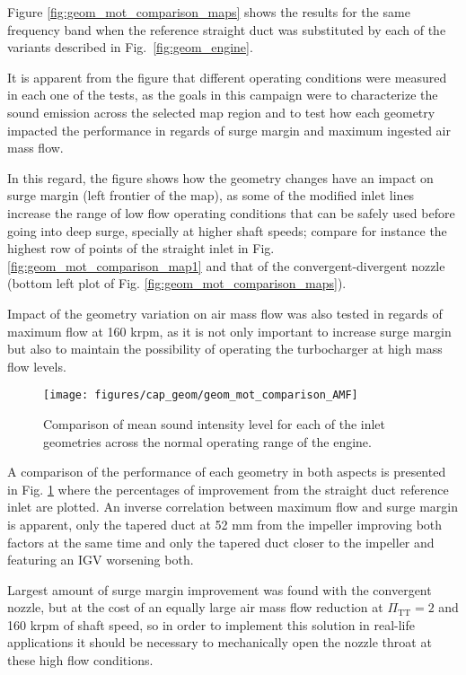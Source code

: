 Figure \ref{fig:geom_mot_comparison_maps} shows the results for the same frequency band when the reference straight duct was substituted by each of the variants described in Fig.~\ref{fig:geom_engine}. 

It is apparent from the figure that different operating conditions were measured in each one of the tests, as the goals in this campaign were to characterize the sound emission across the selected map region and to test how each geometry impacted the performance in regards of surge margin and maximum ingested air mass flow.

In this regard, the figure shows how the geometry changes have an impact on surge margin (left frontier of the map), as some of the modified inlet lines increase the range of low flow operating conditions that can be safely used before going into deep surge, specially at higher shaft speeds; compare for instance the highest row of points of the straight inlet in Fig. \ref{fig:geom_mot_comparison_map1} and that of the convergent-divergent nozzle (bottom left plot of Fig. \ref{fig:geom_mot_comparison_maps}).

Impact of the geometry variation on air mass flow was also tested in regards of maximum flow at 160 krpm, as it is not only important to increase surge margin but also to maintain the possibility of operating the turbocharger at high mass flow levels. 

\begin{figure}[t!]
\centering
\texttt{[image: figures/cap\_geom/geom\_mot\_comparison\_AMF]}
\caption{Comparison of mean sound intensity level for each of the inlet geometries across the normal operating range of the engine.}
\label{fig:geom_mot_comparison_AMF}
\end{figure}

A comparison of the performance of each geometry in both aspects is presented in Fig. \ref{fig:geom_mot_comparison_AMF} where the percentages of improvement from the straight duct reference inlet are plotted. An inverse correlation between maximum flow and surge margin is apparent, only the tapered duct at 52 mm from the impeller improving both factors at the same time and only the tapered duct closer to the impeller and featuring an IGV worsening both.

Largest amount of surge margin improvement was found with the convergent nozzle, but at the cost of an equally large air mass flow reduction at $\Pi_\text{TT} = 2$ and 160 krpm of shaft speed, so in order to implement this solution in real-life applications it should be necessary to mechanically open the nozzle throat at these high flow conditions.

